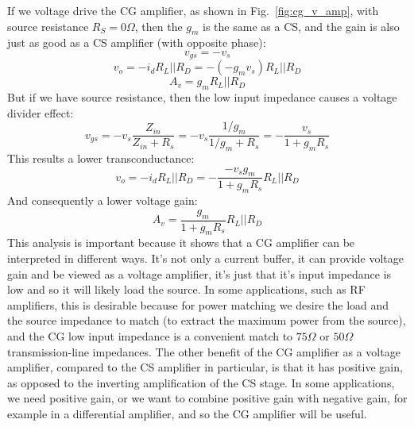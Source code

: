 If we voltage drive the CG amplifier, as shown in Fig.~\ref{fig:cg_v_amp}, with source resistance $R_S = 0\Omega$, then the $g_m$ is the same as a CS, and the gain is also just as good as a CS amplifier (with opposite phase):
%
\begin{equation}
	v_{gs} = -v_s 
\end{equation}
%
\begin{equation}
	v_{o} = - i_d R_L||R_D =  - (-g_m v_s) R_L||R_D 
\end{equation}
%
\begin{equation}
	A_v = g_m R_L||R_D
\end{equation}
%
But if we have source resistance, then the low input impedance causes a voltage divider effect:
%
\begin{equation}
	v_{gs} = -v_s \frac{Z_{in}}{Z_{in} + R_s} = -v_s \frac{1/g_m}{1/g_m + R_s} = - \frac{v_s}{1 + g_m R_s}
\end{equation}
%
This results a lower transconductance:
%
\begin{equation}
	v_{o} = - i_d R_L||R_D =  - \frac{-v_s g_m }{1 + g_m R_s} R_L||R_D 
\end{equation}
%
And consequently a lower voltage gain: 
%
\begin{equation}
	A_v = \frac{g_m }{1 + g_m R_s} R_L||R_D
\end{equation}
%
This analysis is important because it shows that a CG amplifier can be interpreted in different ways.  It's not only a current buffer, it can provide voltage gain and be viewed as a voltage amplifier, it's just that it's input impedance is low and so it will likely load the source.  In some applications, such as RF amplifiers, this is desirable because for power matching we desire the load and the source impedance to match (to extract the maximum power from the source), and the CG low input impedance is a convenient match to $75\Omega$ or $50\Omega$ transmission-line impedances.  The other benefit of the CG amplifier as a voltage amplifier, compared to the CS amplifier in particular, is that it has positive gain, as opposed to the inverting amplification of the CS stage.  In some applications, we need positive gain, or we want to combine positive gain with negative gain, for example in a differential amplifier, and so the CG amplifier will be useful.











